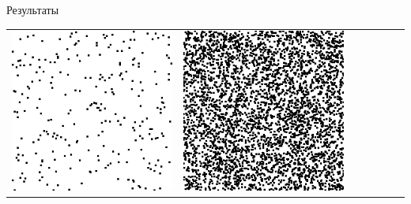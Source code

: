 \documentclass[12pt]{beamer}
\begin{document}
\begin{frame}{Результаты}
\begin{table}
\begin{center}
\begin{tabular}{p{1.2cm} p{1.2cm} p{1.2cm} p{1.2cm} p{1.2cm} p{1.2cm} p{1.2cm}}
					\includegraphics[width=1\linewidth]{8-results/sand-trend8/left3}
					&
					\includegraphics[width=1\linewidth]{8-results/sand-trend8/right3}
					&

\end{tabular}
\end{center}
\end{table}
\end{frame}
\end{document}
